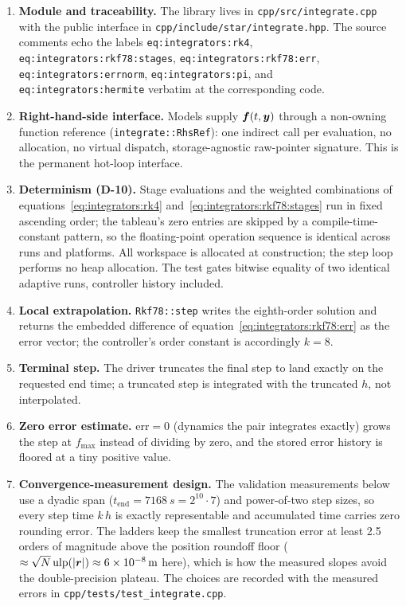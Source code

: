 \begin{enumerate}
  \item \textbf{Module and traceability.} The library lives in
    \texttt{cpp/src/integrate.cpp} with the public interface in
    \texttt{cpp/include/star/integrate.hpp}. The source comments echo the
    labels \texttt{eq:integrators:rk4},
    \texttt{eq:integrators:rkf78:stages},
    \texttt{eq:integrators:rkf78:err}, \texttt{eq:integrators:errnorm},
    \texttt{eq:integrators:pi}, and \texttt{eq:integrators:hermite}
    verbatim at the corresponding code.
  \item \textbf{Right-hand-side interface.} Models supply
    $\bm{f}(t, \bm{y})$ through a non-owning function reference
    (\texttt{integrate::RhsRef}): one indirect call per evaluation, no
    allocation, no virtual dispatch, storage-agnostic raw-pointer
    signature. This is the permanent hot-loop interface.
  \item \textbf{Determinism (D-10).} Stage evaluations and the weighted
    combinations of equations~\eqref{eq:integrators:rk4}
    and~\eqref{eq:integrators:rkf78:stages} run in fixed ascending order;
    the tableau's zero entries are skipped by a compile-time-constant
    pattern, so the floating-point operation sequence is identical across
    runs and platforms. All workspace is allocated at construction; the
    step loop performs no heap allocation. The test
     gates bitwise equality of
    two identical adaptive runs, controller history included.
  \item \textbf{Local extrapolation.} \texttt{Rkf78::step} writes the
    eighth-order solution and returns the embedded difference of
    equation~\eqref{eq:integrators:rkf78:err} as the error vector; the
    controller's order constant is accordingly $k = 8$.
  \item \textbf{Terminal step.} The driver truncates the final step to land
    exactly on the requested end time; a truncated step is integrated with
    the truncated $h$, not interpolated.
  \item \textbf{Zero error estimate.} $\mathrm{err} = 0$ (dynamics the pair
    integrates exactly) grows the step at $f_{\max}$ instead of dividing by
    zero, and the stored error history is floored at a tiny positive value.
  \item \textbf{Convergence-measurement design.} The validation
    measurements below use a dyadic span ($t_{\text{end}} = \qty{7168}{s} =
    2^{10}\cdot 7$) and power-of-two step sizes, so every step time
    $k\,h$ is exactly representable and accumulated time carries zero
    rounding error. The ladders keep the smallest truncation error at least
    2.5 orders of magnitude above the position roundoff floor
    ($\approx \sqrt{N}\,\mathrm{ulp}(|\bm{r}|) \approx \qty{6e-8}{m}$
    here), which is how the measured slopes avoid the double-precision
    plateau. The choices are recorded with the measured errors in
    \texttt{cpp/tests/test\_integrate.cpp}.
\end{enumerate}

